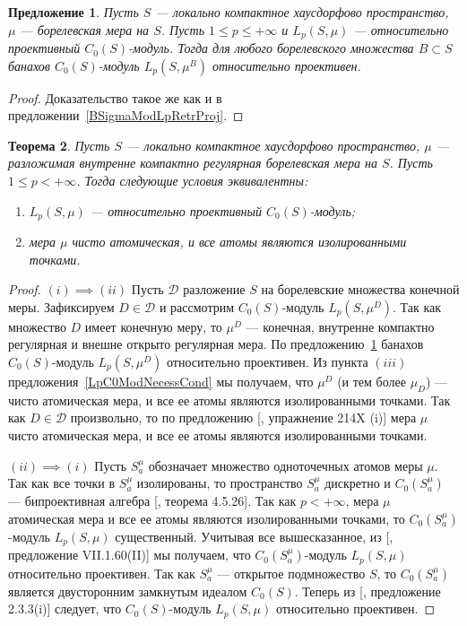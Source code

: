 \documentclass[12pt]{article}
\newtheorem{theorem}{Теорема}[section]
\newtheorem{proposition}[theorem]{Предложение}
\begin{document}
\begin{proposition}\label{C0ModLpRetrProj} Пусть $S$ --- локально компактное
    хаусдорфово пространство, $\mu$ --- борелевская мера на $S$. Пусть $1\leq
        p\leq +\infty$ и $L_p(S,\mu)$ --- относительно проективный $C_0(S)$-модуль.
    Тогда для любого борелевского множества $B\subset S$ банахов $C_0(S)$-модуль
    $L_p(S,\mu^B)$ относительно проективен.
\end{proposition}
\begin{proof} Доказательство такое же как и в
    предложении~\ref{BSigmaModLpRetrProj}.
\end{proof}

\begin{theorem}\label{ReflLpC0ModCrit} Пусть $S$ --- локально компактное
    хаусдорфово пространство, $\mu$ --- разложимая внутренне компактно
    регулярная борелевская мера на $S$. Пусть $1\leq p< +\infty$. Тогда
    следующие условия эквивалентны:
    \begin{enumerate}[label = (\roman*)]
        \item $L_p(S,\mu)$ --- относительно проективный $C_0(S)$-модуль;

        \item мера $\mu$ чисто атомическая, и все атомы являются изолированными
              точками.
    \end{enumerate}
\end{theorem}
\begin{proof} $(i)\implies (ii)$ Пусть $\mathcal{D}$ разложение $S$ на
    борелевские множества конечной меры. Зафиксируем $D\in\mathcal{D}$ и
    рассмотрим $C_0(S)$-модуль $L_p(S,\mu^D)$. Так как множество $D$ имеет
    конечную меру, то $\mu^D$ --- конечная, внутренне компактно регулярная и
    внешне открыто регулярная мера. По предложению~\ref{C0ModLpRetrProj} банахов
    $C_0(S)$-модуль $L_p(S,\mu^D)$ относительно проективен. Из пункта $(iii)$
    предложения~\ref{LpC0ModNecessCond} мы получаем, что $\mu^D$ (и тем более
    $\mu_D$) --- чисто атомическая мера, и все ее атомы являются изолированными
    точками. Так как $D\in\mathcal{D}$ произвольно, то по предложению
    [\cite{FremMeasTh2}, упражнение 214X (i)] мера $\mu$ чисто атомическая мера,
    и все ее атомы являются изолированными точками.

    $(ii)\implies (i)$ Пусть $S_a^\mu$ обозначает множество одноточечных атомов
    меры $\mu$. Так как все точки в $S_a^\mu$ изолированы, то пространство
    $S_a^\mu$ дискретно и $C_0(S_a^\mu)$ --- бипроективная алгебра
    [\cite{HelHomolBanTopAlg}, теорема 4.5.26]. Так как $p<+\infty$, мера $\mu$
    атомическая мера и все ее атомы являются изолированными точками, то
    $C_0(S_a^\mu)$-модуль $L_p(S,\mu)$ существенный. Учитывая все вышесказанное,
    из [\cite{HelBanLocConvAlg}, предложение VII.1.60(II)] мы получаем, что
    $C_0(S_a^\mu)$-модуль $L_p(S,\mu)$ относительно проективен. Так как
    $S_a^\mu$ --- открытое подмножество $S$, то $C_0(S_a^\mu)$ является
    двусторонним замкнутым идеалом  $C_0(S)$. Теперь из
    [\cite{RamsHomPropSemgroupAlg}, предложение 2.3.3(i)] следует, что
    $C_0(S)$-модуль $L_p(S,\mu)$ относительно проективен.
\end{proof}
\end{document}

